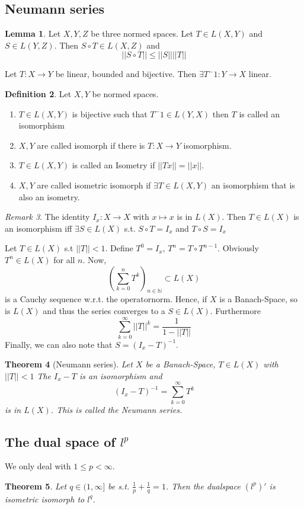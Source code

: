 \documentclass[a4paper, 12pt]{article}
\theoremstyle{plain}
\newtheorem{theorem}{Theorem}[subsection] %
\theoremstyle{definition}
\newtheorem{definition}[theorem]{Definition} %
\theoremstyle{lemma}
\newtheorem{lemma}[theorem]{Lemma}
\theoremstyle{remark}
\newtheorem{remark}[theorem]{Remark}
\theoremstyle{corollary}
\theoremstyle{example}
\begin{document}
	\subsection{Neumann series}
	\begin{lemma}
		Let $X,Y,Z$ be three normed spaces. Let $T \in L(X,Y)$ and $S \in L(Y,Z)$. Then $S\circ T \in L(X,Z)$ and \[||S\circ T||\leq ||S|| ||T||\] 
	\end{lemma}
	Let $T:X\to Y$ be linear, bounded and bijective. Then $\exists T^-1: Y \to X$ linear. 
	\begin{definition}
		Let $X,Y$ be normed spaces. \begin{enumerate}
			\item $T \in L(X,Y)$ is bijective such that $T^-1 \in L(Y,X)$ then $T$ is called an isomorphism
			\item $X,Y$ are called isomorph if there is $T: X \to Y$ isomorphism.
			\item $T \in L(X,Y)$ is called an Isometry if $||Tx|| = ||x||$.
			\item $X,Y$ are called isometric isomorph if $\exists T \in L(X,Y)$ an isomorphism that is also an isometry.
		\end{enumerate}
	\end{definition} 
	\begin{remark}
		The identity $I_x: X \to X$ with $x \mapsto x$ is in $L(X)$. Then $T \in L(X)$ is an isomorphism iff $\exists S \in L(X)$ s.t. $S\circ T = I_x$ and $T\circ S = I_x$
	\end{remark}
	Let $T \in L(X)$ s.t $||T|| < 1$. Define $T^0 = I_x$, $T^n = T\circ T^{n-1}$. Obviously $T^n \in L(X)$ for all $n$. Now, \[\left(\sum_{k=0}^{n}T^k \right)_{n\in \mathbb{N}} \subset L(X)\] is a Cauchy sequence w.r.t. the operatornorm. Hence, if $X$ is a Banach-Space, so is $L(X)$ and thus the series converges to a $S \in L(X)$. Furthermore \[\sum_{k=0}^\infty ||T||^k = \frac{1}{1-||T||}\]
	Finally, we can also note that $S = (I_x-T)^{-1}$.
	\begin{theorem}[Neumann series]
		Let $X$ be a Banach-Space, $T \in L(X)$ with $||T|| < 1$ The $I_x - T$ is an isomorphism and \[(I_x - T)^{-1} = \sum_{k=0}^\infty T^k\] is in $L(X)$. This is called the Neumann series.
	\end{theorem}
	\subsection{The dual space of $l^p$}
	We only deal with $1\leq p < \infty$.
	\begin{theorem}
		Let $q \in (1,\infty]$ be s.t. $\frac{1}{p} + \frac{1}{q} = 1$. Then the dualspace $(l^p)'$ is isometric isomorph to $l^q$.
	\end{theorem}
\end{document}
